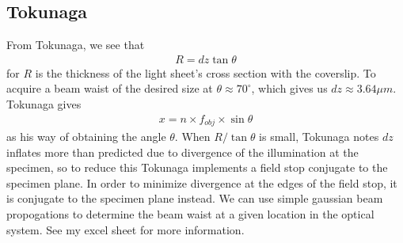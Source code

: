 \subsection[]{Tokunaga}
From Tokunaga, we see that
\begin{gather}
    R = dz \tan \theta
\end{gather}
for $R$ is the thickness of the light sheet's cross section with the coverslip.
To acquire a beam waist of the desired size at $\theta \approx 70^\circ$, which gives us $dz \approx 3.64 \mu m$.  Tokunaga gives 
\begin{gather}
    x=n  \times f_{obj} \times \sin \theta
\end{gather}
as his way of obtaining the angle $\theta$.
When $R / \tan \theta $ is small, Tokunaga notes $dz$ inflates more than predicted due to divergence of the illumination at the specimen, so to reduce this Tokunaga implements a field stop conjugate to the specimen plane. In order to minimize divergence at the edges of the field stop, it is conjugate to the specimen plane instead.
We can use simple gaussian beam propogations to determine the beam waist at a given location in the optical system. See my excel sheet for more information.